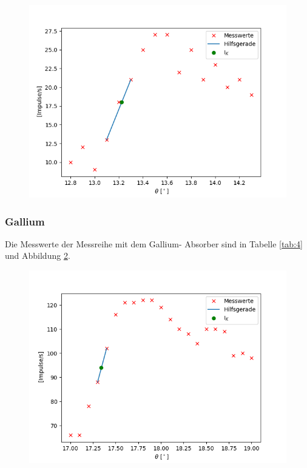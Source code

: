 \begin{figure}
    \centering
    \includegraphics{br.png}
    \label{fig:br}
\end{figure}

\subsubsection{Gallium}

Die Messwerte der Messreihe mit dem Gallium- Absorber sind in Tabelle \ref{tab:4} und Abbildung \ref{fig:ga}. 

\begin{figure}
    \centering
    \includegraphics{ga.png}
    \label{fig:ga}
\end{figure}

